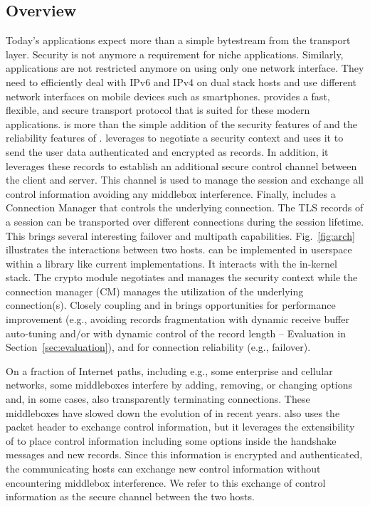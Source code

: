 \subsection{Overview}
Today's applications expect more than a simple bytestream from the transport
layer. Security is not anymore a requirement for niche applications. Similarly,
applications are not restricted anymore on using only one network interface.
They need to efficiently deal with IPv6 and IPv4 on dual stack hosts and use
different network interfaces on mobile devices such as smartphones. \tcpls
provides a fast, flexible, and secure transport protocol that is suited for
these modern applications. \tcpls is more than the simple addition of the
security features of \tls and the reliability features of \tcp.  \tcpls
leverages  to negotiate a security context and uses it to send the user
data authenticated and encrypted as \tls records. In addition, it leverages
these records to establish an additional secure control channel between the
client and server.  This channel is used to manage the \tcpls session and
exchange all control information avoiding any middlebox interference.
Finally, \tcpls includes a Connection Manager that controls the underlying \tcp
connection. The TLS records of a \tcpls session can be transported over
different \tcp connections during the session lifetime. This brings several
interesting failover and multipath capabilities.  Fig.~\ref{fig:arch}
illustrates the interactions between two \tcpls hosts.  \tcpls can be
implemented in userspace within a library like current \tls implementations. It
interacts with the in-kernel \tcp stack. The crypto module negotiates and
manages the security context while the connection manager (CM) manages the
utilization of the underlying \tcp connection(s).  Closely coupling \tcp and
\tls in \tcpls brings opportunities for performance improvement (e.g., avoiding
records fragmentation with dynamic receive buffer auto-tuning and/or with
dynamic control of the record length -- Evaluation in
Section~\ref{sec:evaluation}), and for connection reliability (e.g.,
failover).

On a fraction of Internet paths, including e.g., some
enterprise and cellular networks, some middleboxes interfere by adding,
removing, or changing \tcp
options~\cite{wang2011untold,honda2011still,xu2015investigating} and, in some
cases, also transparently terminating \tcp connections. These middleboxes have
slowed down the evolution of \tcp in recent years. \tcpls also uses the packet
header to exchange \tcp control information, but it leverages the extensibility
of  to place control information including some \tcp options inside the
\tls handshake messages and new \tls records. Since this information is
encrypted and authenticated, the communicating hosts can exchange new control
information without encountering middlebox interference. We refer to this
exchange of control information as the secure channel between the two hosts.

